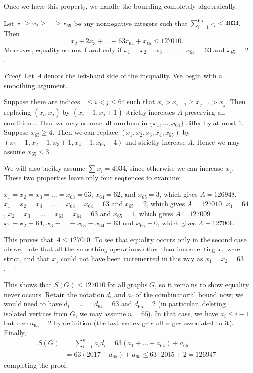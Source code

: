 Once we have this property, we handle the bounding completely algebraically.
\begin{lemma*}
  Let $x_1 \ge x_2 \ge \dots \ge x_{65}$ be any nonnegative integers
  such that $\sum_{i=1}^{65} x_i \le 4034$.
  Then \[ x_2 + 2x_3 + \dots + 63x_{64} + x_{65} \le 127010. \]
  Moreover, equality occurs if and only if
  $x_1 = x_2 = x_3 = \dots = x_{64} = 63$ and $x_{65} = 2$.
\end{lemma*}
\begin{proof}
  Let $A$ denote the left-hand side of the inequality.
  We begin with a smoothing argument.
  \begin{itemize}
    \ii Suppose there are indices $1 \le i < j \le 64$
    such that $x_i > x_{i+1} \ge x_{j-1} > x_j$.
    Then replacing $(x_i, x_j)$ by $(x_i-1, x_j+1)$
    strictly increases $A$ preserving all conditions.
    Thus we may assume all numbers in $\{x_1, \dots, x_{64}\}$
    differ by at most $1$.
    \ii Suppose $x_{65} \ge 4$.
    Then we can replace $(x_1, x_2, x_3, x_4, x_{65})$
    by $(x_1+1, x_2+1, x_3+1, x_4+1, x_{65}-4)$
    and strictly increase $A$.
    Hence we may assume $x_{65} \le 3$.
  \end{itemize}
  We will also tacitly assume $\sum x_i = 4034$,
  since otherwise we can increase $x_1$.
  These two properties leave only four sequences to examine:
  \begin{itemize}
    \ii $x_1 = x_2 = x_3 = \dots = x_{63} = 63$, $x_{64} = 62$,
    and $x_{65} = 3$, which gives $A = 126948$.
    \ii $x_1 = x_2 = x_3 = \dots = x_{63} = x_{64} = 63$ and $x_{65} = 2$,
    which gives $A = 127010$.
    \ii $x_1 = 64$, $x_2 = x_3 = \dots = x_{63} = x_{64} = 63$ and $x_{65} = 1$,
    which gives $A = 127009$.
    \ii $x_1 = x_2 = 64$, $x_3 = \dots = x_{63} = x_{64} = 63$ and $x_{65} = 0$,
    which gives $A = 127009$.
  \end{itemize}
  This proves that $A \le 127010$.
  To see that equality occurs only in the second case above,
  note that all the smoothing operations other than incrementing $x_1$ were strict,
  and that $x_1$ could not have been incremented in this way
  as $x_1 = x_2 = 63$.
\end{proof}

This shows that $S(G) \le 127010$ for all graphs $G$,
so it remains to show equality never occurs.
Retain the notation $d_i$ and $a_i$ of the combinatorial bound now;
we would need to have $d_1 = \dots = d_{64} = 63$ and $d_{65} = 2$
(in particular, deleting isolated vertices from $G$, we may assume $n=65$).
In that case, we have $a_i \le i-1$ but also $a_{65} = 2$ by definition
(the last vertex gets all edges associated to it).
Finally,
\begin{align*}
  S(G) &= \sum_{i=1}^n a_i d_i = 63(a_1 + \dots + a_{64}) + a_{65} \\
  &= 63(2017-a_{65}) + a_{65} \le 63 \cdot 2015 + 2 = 126947
\end{align*}
completing the proof.

